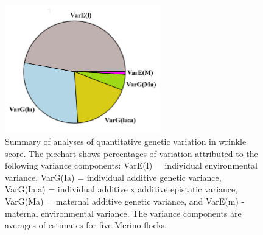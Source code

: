 %

\begin{figure}[!h]
  \centering
  \captionsetup{width=0.6\textwidth}
  \includegraphics[width=0.6\textwidth]{fig12crop.jpg}
  \caption{Summary of analyses of quantitative genetic variation in wrinkle score. The piechart shows percentages of variation attributed to the following variance components: VarE(I) = individual environmental variance, VarG(Ia) = individual additive genetic variance, VarG(Ia:a) = individual additive x additive epistatic variance, VarG(Ma) = maternal additive genetic variance, and VarE(m) - maternal environmental variance. The variance components are averages of estimates for five Merino flocks.}
  \label{fig:qgwrin}
\end{figure}

%

